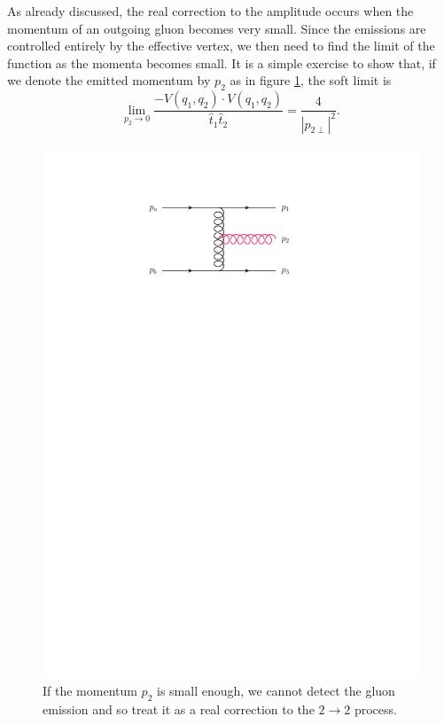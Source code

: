 As already discussed, the real correction to the amplitude occurs when the momentum of an outgoing gluon becomes very small. Since the emissions are controlled entirely by the effective vertex, we then need to find the limit of the function as the momenta becomes small. It is a simple exercise to show that, if we denote the emitted momentum by $p_2$ as in figure \ref{fig:realcorrection}, the soft limit is
\begin{equation}
\lim_{p_2 \to 0} \frac{-V(q_1, q_2) \cdot V(q_1,q_2)}{\hat{t}_1 \hat{t}_2} = \frac{4}{|p_{2 \perp}|^2}.
\end{equation}
\begin{figure}[t]
\centering
\includegraphics[scale=1]{Images/real_correction.pdf} 
\caption{If the momentum $p_2$ is small enough, we cannot detect the gluon emission and so treat it as a real correction to the $2 \to 2$ process.}
\label{fig:realcorrection}
\end{figure}

